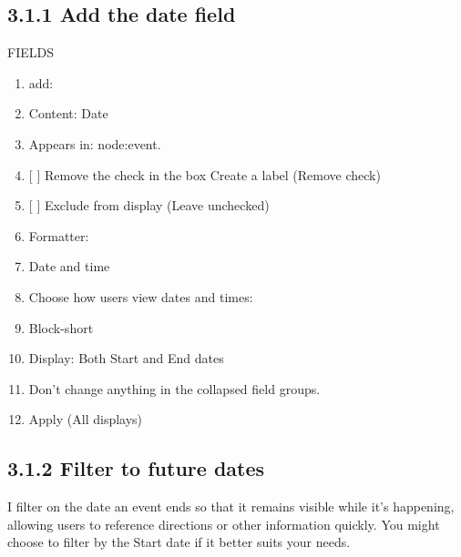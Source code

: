 \documentclass[letterpaper,10pt,english]{sphinxmanual}
\begin{document}
\subsection{3.1.1 Add the date field}
\label{event_calendar:id1}
FIELDS
\begin{enumerate}
\item {} 
add:

\item {} 
Content: Date

\item {} 
Appears in: node:event.

\item {} 
{[} {]} Remove the check in the box Create a label (Remove check)

\item {} 
{[} {]} Exclude from display (Leave unchecked)

\item {} 
Formatter:

\item {} 
Date and time

\item {} 
Choose how users view dates and times:

\item {} 
Block-short

\item {} 
Display: Both Start and End dates

\item {} 
Don't change anything in the collapsed field groups.

\item {} 
Apply (All displays)

\end{enumerate}


\subsection{3.1.2 Filter to future dates}
\label{event_calendar:filter-to-future-dates}
I filter on the date an event ends so that it remains visible while it's happening, allowing users to reference directions or other information quickly. You might choose to filter by the Start date if it better suits your needs.
\end{document}
